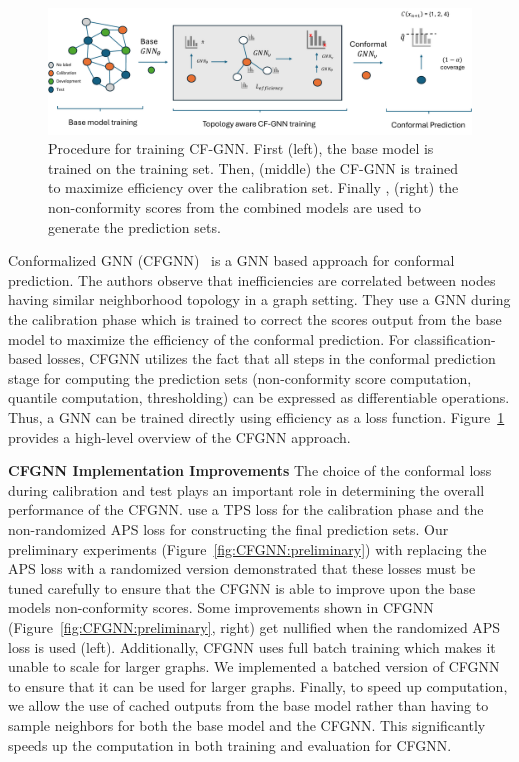 \begin{figure}
    \centering
    \includegraphics[width=\linewidth]{graphConformal/figures/CFGNN.pdf}
    \caption{Procedure for training CF-GNN. First (left), the base model is trained on the training set. Then, (middle) the CF-GNN is trained to maximize efficiency over the calibration set. Finally , (right) the non-conformity scores from the combined models are used to generate the prediction sets.}
    \label{fig:conformalized_gnn}
\end{figure}

Conformalized GNN (CFGNN)~\citep{huang2024uncertainty} is a GNN based approach for conformal prediction.
The authors observe that inefficiencies are correlated between nodes having similar neighborhood topology in a graph setting.
They use a GNN during the calibration phase which is trained to correct the scores output from the base model to maximize the efficiency of the conformal prediction.
For classification-based losses, CFGNN utilizes the fact that all steps in the conformal prediction stage for computing the prediction sets (non-conformity score computation, quantile computation, thresholding) can be expressed as differentiable operations.
Thus, a GNN can be trained directly using efficiency as a loss function.
Figure~\ref{fig:conformalized_gnn} provides a high-level overview of the CFGNN approach.

\noindent \textbf{CFGNN Implementation Improvements}
The choice of the conformal loss during calibration and test plays an important role in determining the overall performance of the CFGNN.
\citet{huang2024uncertainty} use a TPS loss for the calibration phase and the non-randomized APS loss for constructing the final prediction sets.
Our preliminary experiments (Figure~\ref{fig:CFGNN:preliminary}) with replacing the APS loss with a randomized version demonstrated that these losses must be tuned carefully to ensure that the CFGNN is able to improve upon the base models non-conformity scores.
Some improvements shown in CFGNN (Figure~\ref{fig:CFGNN:preliminary}, right) get nullified when the randomized APS loss is used (left).
Additionally, CFGNN uses full batch training which makes it unable to scale for larger graphs.
We implemented a batched version of CFGNN to ensure that it can be used for larger graphs.
Finally, to speed up computation, we allow the use of cached outputs from the base model rather than having to sample neighbors for both the base model and the CFGNN. 
This significantly speeds up the computation in both training and evaluation for CFGNN.

